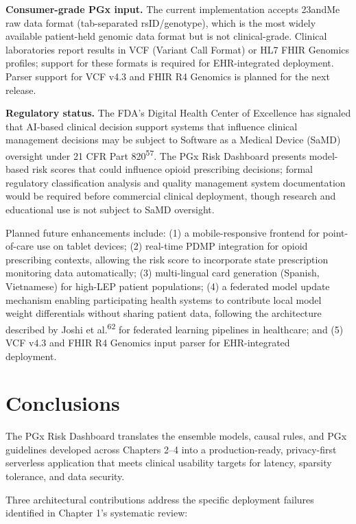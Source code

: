 \documentclass[
  12pt,
]{book}
\begin{document}
\textbf{Consumer-grade PGx input.} The current implementation accepts
23andMe raw data format (tab-separated rsID/genotype), which is the most
widely available patient-held genomic data format but is not
clinical-grade. Clinical laboratories report results in VCF (Variant
Call Format) or HL7 FHIR Genomics profiles; support for these formats is
required for EHR-integrated deployment. Parser support for VCF v4.3 and
FHIR R4 Genomics is planned for the next release.

\textbf{Regulatory status.} The FDA's Digital Health Center of
Excellence has signaled that AI-based clinical decision support systems
that influence clinical management decisions may be subject to Software
as a Medical Device (SaMD) oversight under 21 CFR Part
820\textsuperscript{57}. The PGx Risk Dashboard presents model-based
risk scores that could influence opioid prescribing decisions; formal
regulatory classification analysis and quality management system
documentation would be required before commercial clinical deployment,
though research and educational use is not subject to SaMD oversight.

Planned future enhancements include: (1) a mobile-responsive frontend
for point-of-care use on tablet devices; (2) real-time PDMP integration
for opioid prescribing contexts, allowing the risk score to incorporate
state prescription monitoring data automatically; (3) multi-lingual card
generation (Spanish, Vietnamese) for high-LEP patient populations; (4) a
federated model update mechanism enabling participating health systems
to contribute local model weight differentials without sharing patient
data, following the architecture described by Joshi et
al.\textsuperscript{62} for federated learning pipelines in healthcare;
and (5) VCF v4.3 and FHIR R4 Genomics input parser for EHR-integrated\\
deployment.

\chapter{Conclusions}\label{sec-conclusions}

The PGx Risk Dashboard translates the ensemble models, causal rules, and
PGx guidelines developed across Chapters 2--4 into a production-ready,
privacy-first serverless application that meets clinical usability
targets for latency, sparsity tolerance, and data security.

Three architectural contributions address the specific deployment
failures identified in Chapter 1's systematic review:
\end{document}
